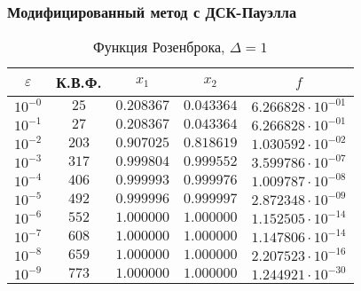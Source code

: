 \documentclass[a4paper,12pt,notitlepage,pdftex,headsepline]{scrartcl}
\begin{document}
    \subsubsection{Модифицированный метод с ДСК-Пауэлла}
        \begin{table}[ht]
          \centering
          \caption{Функция Розенброка, $\Delta = 1$}
          \begin{tabular}{|c|c|c|c|c|}
            \hline
            $\varepsilon$ & К.В.Ф. & $x_1$ & $x_2$ & $f$\\
            \hline
            $10^{-0}$ & $25$ & $0.208367$ & $0.043364$ & $6.266828\cdot 10^{-01}$\\
            $10^{-1}$ & $27$ & $0.208367$ & $0.043364$ & $6.266828\cdot 10^{-01}$\\
            $10^{-2}$ & $203$ & $0.907025$ & $0.818619$ & $1.030592\cdot 10^{-02}$\\
            $10^{-3}$ & $317$ & $0.999804$ & $0.999552$ & $3.599786\cdot 10^{-07}$\\
            $10^{-4}$ & $406$ & $0.999993$ & $0.999976$ & $1.009787\cdot 10^{-08}$\\
            $10^{-5}$ & $492$ & $0.999996$ & $0.999997$ & $2.872348\cdot 10^{-09}$\\
            $10^{-6}$ & $552$ & $1.000000$ & $1.000000$ & $1.152505\cdot 10^{-14}$\\
            $10^{-7}$ & $608$ & $1.000000$ & $1.000000$ & $1.147806\cdot 10^{-14}$\\
            $10^{-8}$ & $659$ & $1.000000$ & $1.000000$ & $2.207523\cdot 10^{-16}$\\
            $10^{-9}$ & $773$ & $1.000000$ & $1.000000$ & $1.244921\cdot 10^{-30}$\\
            \hline
          \end{tabular}
        \end{table}
\end{document}
